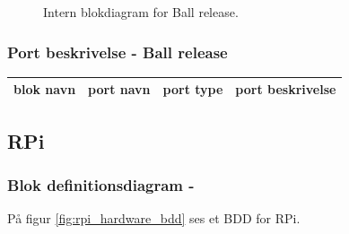 \documentclass[Arkitektur/System_main.tex]{subfiles}
\begin{document}
\begin{figure}[H]
    \centering
    \caption{Intern blokdiagram for Ball release.}
    \label{fig:ball_release_hardware_ibd}
\end{figure}

\subsubsection{Port beskrivelse - Ball release} \label{sec:ball_release_hardware_ports}


\begin{table}[H]
\begin{tabular}{|l|l|l|l|}
\hline
blok navn & port navn & port type & port beskrivelse \\ \hline
\end{tabular}
\end{table}




\subsection{RPi} \label{sec:rpi_hardware}
\subsubsection{Blok definitionsdiagram - } \label{sec:rpi_hardware_bdd}

På figur \ref{fig:rpi_hardware_bdd} ses et BDD for RPi.
\end{document}
